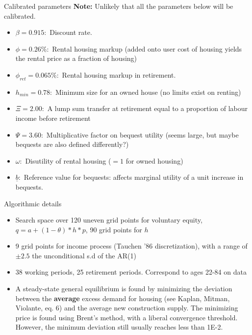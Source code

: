 \documentclass[9pt]{beamer}
\begin{document}
\begin{frame}{Calibrated parameters}
        \textbf{Note:} Unlikely that all the parameters below will be
        calibrated.
\begin{itemize}
        \item $\beta = 0.915:$ Discount rate.
        \item $\phi = 0.26\%:$ Rental housing markup (added onto user cost of housing
                yields the rental price as a fraction of housing)
        \item $\phi_{ret} = 0.065\% : $ Rental housing markup in retirement.
        \item $h_{min} = 0.78:$ Minimum size for an owned house (no limits exist on
                renting)
        \item $\Xi = 2.00 :$ A lump sum transfer at retirement equal to a proportion
                of labour income before retirement
        \item $\Psi = 3.60:$ Multiplicative factor on bequest utility (seems large,
               but maybe bequests are also defined differently?)
       \item  $\omega:$ Disutility of rental housing ($=1$ for owned housing)
       \item  $\underline{b}:$ Reference value for bequests: affects marginal
               utility of a unit increase in bequests.
\end{itemize}
\end{frame}

\begin{frame}{Algorithmic details}
\begin{itemize}
        \item Search space over 120 uneven grid points for voluntary equity,
              $q = a + (1-\theta)*h*p$, 90 grid points for $h$
      \item 9 grid points for income process (Tauchen '86 discretization),
              with a range of $\pm 2.5$ the unconditional s.d
              of the AR(1)
      \item  38 working periods, 25 retirement periods. Correspond to ages
              22-84 on data
      \item A steady-state general equilibrium is found by minimizing the
              deviation between the \textbf{average} excess demand for housing
              (see Kaplan, Mitman, Violante, eq. 6) and the average new
              construction supply. \newline
              The minimizing price is found using Brent's method, with
              a liberal convergence threshold. However, the minimum deviation
              still usually reaches less than 1E-2.
\end{itemize}
\end{frame}
\end{document}
